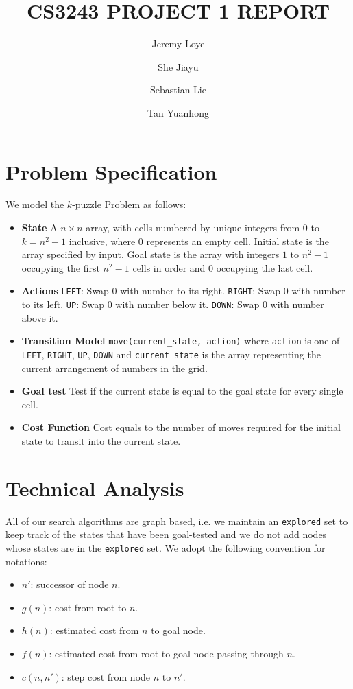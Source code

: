 \documentclass{llncs}
\begin{document}
\title{CS3243 PROJECT 1 REPORT}
\author{Jeremy Loye \and She Jiayu \and Sebastian Lie \and Tan Yuanhong}
\maketitle

\section{Problem Specification}
We model the $k$-puzzle Problem as follows:
\begin{itemize}
	\item[] \textbf{State}
		A $n \times n$ array, with cells numbered by unique integers from $0$ to $k = n ^ 2 - 1$ inclusive, where $0$ represents an empty cell. Initial state is the array specified by input. Goal state is the array with integers $1$ to $n ^ 2 - 1$ occupying the first $n^2 - 1$ cells in order and $0$ occupying the last cell.
	\item[] \textbf{Actions}
		\texttt{LEFT}: Swap $0$ with number to its right.  \texttt{RIGHT}: Swap $0$ with number to its left. \texttt{UP}: Swap $0$ with number below it. \texttt{DOWN}: Swap $0$ with number above it.
	\item[] \textbf{Transition Model}
		\texttt{move(current\_state, action)} where \texttt{action} is one of \texttt{LEFT}, \texttt{RIGHT}, \texttt{UP}, \texttt{DOWN} and \texttt{current\_state} is the array representing the current arrangement of numbers in the grid.
	\item[] \textbf{Goal test}
		Test if the current state is equal to the goal state for every single cell.
	\item[] \textbf{Cost Function}
		Cost equals to the number of moves required for the initial state to transit into the current state.
\end{itemize}

\section{Technical Analysis}
All of our search algorithms are graph based, i.e. we maintain an \texttt{explored} set to keep track of the states that have been goal-tested and we do not add nodes whose states are in the \texttt{explored} set. We adopt the following convention for notations:
\begin{itemize}
    \item[] $n'$: successor of node $n$.
	\item[] $g(n)$: cost from root to $n$.
	\item[] $h(n)$: estimated cost from $n$ to goal node.
	\item[] $f(n)$: estimated cost from root to goal node passing through $n$.
	\item[] $c(n,n')$: step cost from node $n$ to $n'$.
\end{itemize}
\end{document}
